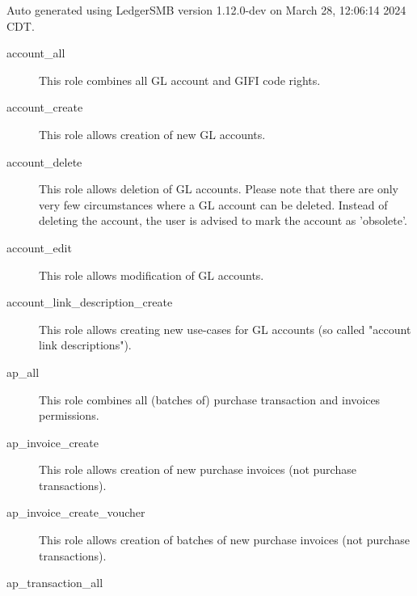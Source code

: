 
Auto generated using LedgerSMB version 1.12.0-dev on March 28, 12:06:14 2024 CDT.

\begin{description}
\item [account\_all] \htmlspacing 
                         This role combines all \gls{GL}  account and GIFI code rights.
\item [account\_create] \htmlspacing 
                         This role allows creation of new \gls{GL}  accounts.
\item [account\_delete] \htmlspacing 
                         This role allows deletion of \gls{GL}  accounts.
                         Please note that there are only very few circumstances
                         where a \gls{GL}  account can be deleted.  Instead of deleting
                         the account, the user is advised to mark the account
                         as 'obsolete'.
\item [account\_edit] \htmlspacing 
                         This role allows modification of \gls{GL}  accounts.
\item [account\_link\_description\_create] \htmlspacing 
                         This role allows creating new use-cases for \gls{GL} 
                         accounts (so called "account link descriptions").
\item [ap\_all] \htmlspacing 
                         This role combines all (batches of) purchase transaction and invoices permissions.
\item [ap\_invoice\_create] \htmlspacing 
                         This role allows creation of new purchase invoices (not purchase transactions).
\item [ap\_invoice\_create\_voucher] \htmlspacing 
                         This role allows creation of batches of new purchase invoices (not purchase transactions).
\item [ap\_transaction\_all] \htmlspacing 

\end{description}
